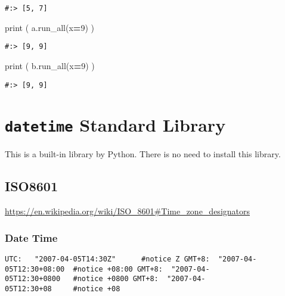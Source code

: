 \documentclass[
]{book}
\newenvironment{Shaded}{\begin{snugshade}}{\end{snugshade}}
\newcommand{\BuiltInTok}[1]{#1}
\newcommand{\DecValTok}[1]{\textcolor[rgb]{0.06,0.06,0.06}{#1}}
\newcommand{\NormalTok}[1]{#1}
\newcommand{\OperatorTok}[1]{\textcolor[rgb]{0.43,0.43,0.43}{\textbf{#1}}}
\begin{document}
\begin{verbatim}
#:> [5, 7]
\end{verbatim}

\begin{Shaded}
\begin{Highlighting}[]
\BuiltInTok{print}\NormalTok{ ( a.run\_all(x}\OperatorTok{=}\DecValTok{9}\NormalTok{) )}
\end{Highlighting}
\end{Shaded}

\begin{verbatim}
#:> [9, 9]
\end{verbatim}

\begin{Shaded}
\begin{Highlighting}[]
\BuiltInTok{print}\NormalTok{ ( b.run\_all(x}\OperatorTok{=}\DecValTok{9}\NormalTok{) )}
\end{Highlighting}
\end{Shaded}

\begin{verbatim}
#:> [9, 9]
\end{verbatim}

\hypertarget{datetime-standard-library}{%
\chapter{\texorpdfstring{\texttt{datetime} Standard Library}{datetime Standard Library}}\label{datetime-standard-library}}

This is a built-in library by Python. There is no need to install this library.

\hypertarget{iso8601}{%
\section{ISO8601}\label{iso8601}}

\url{https://en.wikipedia.org/wiki/ISO_8601\#Time_zone_designators}

\hypertarget{date-time}{%
\subsection{Date Time}\label{date-time}}

\texttt{UTC:\ \ \ "2007-04-05T14:30Z"\ \ \ \ \ \ \#notice\ Z\ GMT+8:\ \ "2007-04-05T12:30+08:00\ \ \#notice\ +08:00\ GMT+8:\ \ "2007-04-05T12:30+0800\ \ \ \#notice\ +0800\ GMT+8:\ \ "2007-04-05T12:30+08\ \ \ \ \ \#notice\ +08}
\end{document}
